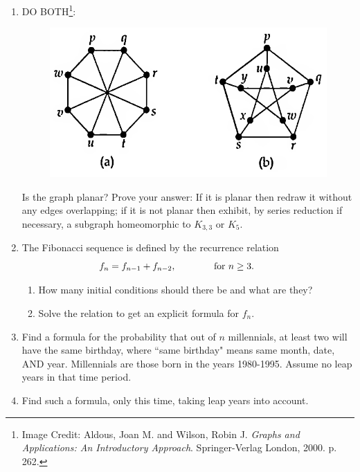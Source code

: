 \documentclass[12pt,letterpaper]{article}
\begin{document}
\begin{enumerate}
\newpage
\item DO BOTH\footnote{Image Credit: Aldous, Joan M. and Wilson, Robin J. {\it Graphs and Applications: An Introductory Approach}.  Springer-Verlag London, 2000. p. 262.}:   
\vspace{-1.1pc}  
\begin{figure}[h]
\begin{center}
\includegraphics*[scale=0.6]{Exam3AldousPlanar.png}
\end{center}
\end{figure}

\vspace{-3.25pc}
Is the graph planar?  Prove your answer: If it is planar then redraw it without any edges overlapping; if it is not planar then exhibit, by series reduction if necessary, a subgraph homeomorphic to $K_{3,3}$ or $K_5$.

\newpage
\item The Fibonacci sequence is defined by the recurrence relation
\[\hspace{-2pc}f_n=f_{n-1}+f_{n-2},\qquad\qquad\text{for $n\geq 3$.}\]
\begin{enumerate}
\item How many initial conditions should there be and what are they?

\vspace{5pc}
\item Solve the relation to get an explicit formula for $f_n$.
\end{enumerate}

\newpage
\item Find a formula for the probability that out of $n$ millennials, at least two will have the same birthday, where ``same birthday" means same month, date, AND year.  Millennials are those born in the years 1980-1995.  Assume no leap years in that time period.

\vspace{20pc}
\item Find such a formula, only this time, taking leap years into account.

\end{enumerate}
\end{document}
